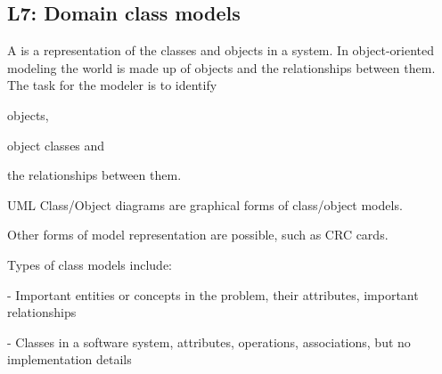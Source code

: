 \subsection{L7: Domain class models}
\begin{compactitem}
\item A  is a representation of the classes and objects in a system. 
In object-oriented modeling the world is made up of objects and the relationships between them. The task for the modeler is to identify 
\begin{compactitem}
\item objects, 
\item object classes and 
\item the relationships between them.
\end{compactitem}
\item UML Class/Object diagrams are graphical forms of class/object models.
\item Other forms of model representation are possible, such as CRC cards.
\item Types of class models include: 
\begin{compactitem}
\item {} - Important entities or concepts in the problem, their attributes, important relationships

\item {} - Classes in a software system, attributes, operations, associations, but no implementation details


\end{compactitem}
\end{compactitem}
